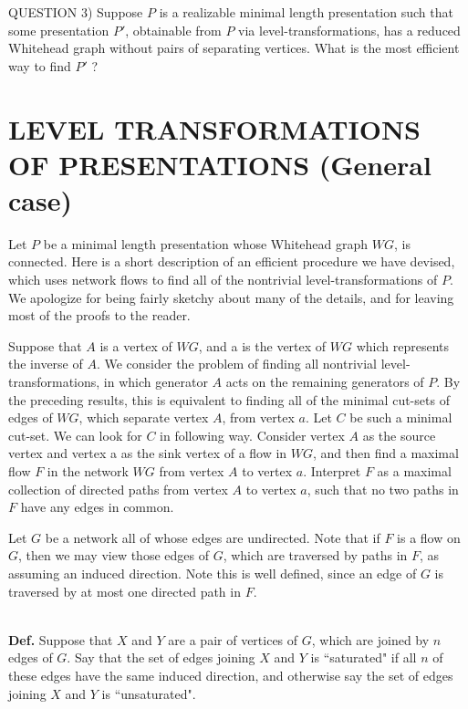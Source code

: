 \documentclass[12pt]{amsart}
\newcommand{\definition}{\ \\ \noindent \textbf{Def.} }
\begin{document}
QUESTION 3)     Suppose $P$ is a realizable minimal length presentation such that some presentation
        $P' $, obtainable from $P$ via level-transformations, has a reduced Whitehead graph without
        pairs of separating vertices. What is the most efficient way to find $P'$ ?
        
                
                        
\section{LEVEL TRANSFORMATIONS OF PRESENTATIONS (General case)}

                Let $P$ be a minimal length presentation whose Whitehead graph $WG$, is connected.
        Here is a short description of an efficient procedure we have devised, which uses
        network flows to find all of the nontrivial level-transformations of $P$. We apologize
        for being fairly sketchy about many of the details, and for leaving most of the proofs
        to the reader.
                
                Suppose that $A$ is a vertex of $WG$, and a is the vertex of $WG$ which represents the
        inverse of $A$. We consider the problem of finding all nontrivial level-transformations,
        in which generator $A$ acts on the remaining generators of $P$. By the preceding results,
        this is equivalent to finding all of the minimal cut-sets of edges of $WG$, which
        separate vertex $A$, from vertex $a$. Let $C$ be such a minimal cut-set. We can look for $C$
        in following way. Consider vertex $A$ as the source vertex and vertex a as the sink
        vertex of a flow in $WG$, and then find a maximal flow $F$ in the network $WG$ from vertex $A$
        to vertex $a$. Interpret $F$ as a maximal collection of directed paths from vertex $A$ to
        vertex $a$, such that no two paths in $F$ have any edges in common.

                Let $G$ be a network all of whose edges are undirected. Note that if $F$ is a flow on
        $G$, then we may view those edges of $G$, which are traversed by paths in $F$, as assuming an
        induced direction. Note this is well defined, since an edge of $G$ is traversed by at
        most one directed path in $F$.
        
        \definition Suppose that $X$ and $Y$ are a pair of vertices of $G$, which are joined by $n$ edges of
        $G$. Say that the set of edges joining $X$ and $Y$ is  ``saturated" if all $n$ of these edges
        have the same induced direction, and otherwise say the set of edges joining $X$ and $Y$
        is  ``unsaturated".
                
\end{document}
